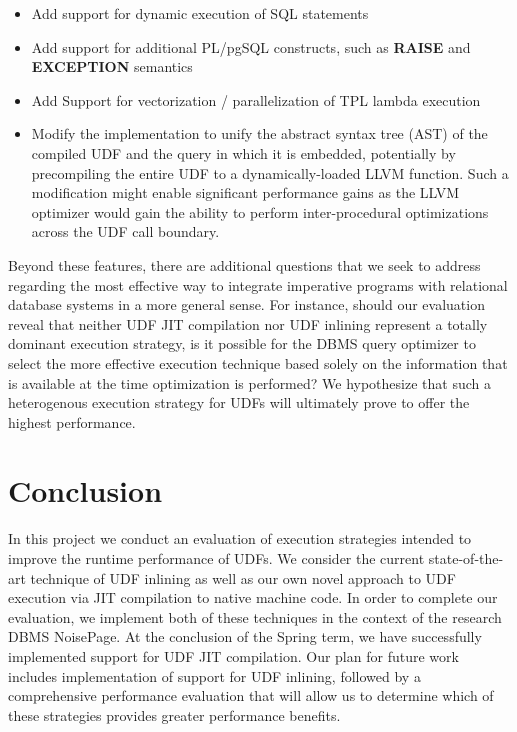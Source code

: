 \documentclass{vldb}
\newcommand{\dbCode}[1]{{\sffamily\small \textbf{#1}}\xspace}
\begin{document}
\begin{itemize}
    \item Add support for dynamic execution of SQL statements
    \item Add support for additional PL/pgSQL constructs, such as \dbCode{RAISE} and \dbCode{EXCEPTION} semantics
    \item Add Support for vectorization / parallelization of TPL lambda execution
    \item Modify the implementation to unify the abstract syntax tree (AST) of the compiled UDF and the query in which it is embedded, potentially by precompiling the entire UDF to a dynamically-loaded LLVM function. Such a modification might enable significant performance gains as the LLVM optimizer would gain the ability to perform inter-procedural optimizations across the UDF call boundary.
\end{itemize}

Beyond these features, there are additional questions that we seek to address regarding the most effective way to integrate imperative programs with relational database systems in a more general sense. For instance, should our evaluation reveal that neither UDF JIT compilation nor UDF inlining represent a totally dominant execution strategy, is it possible for the DBMS query optimizer to select the more effective execution technique based solely on the information that is available at the time optimization is performed? We hypothesize that such a heterogenous execution strategy for UDFs will ultimately prove to offer the highest performance.


\section{Conclusion}

In this project we conduct an evaluation of execution strategies intended to improve the runtime performance of UDFs. We consider the current state-of-the-art technique of UDF inlining as well as our own novel approach to UDF execution via JIT compilation to native machine code. In order to complete our evaluation, we implement both of these techniques in the context of the research DBMS NoisePage. At the conclusion of the Spring term, we have successfully implemented support for UDF JIT compilation. Our plan for future work includes implementation of support for UDF inlining, followed by a comprehensive performance evaluation that will allow us to determine which of these strategies provides greater performance benefits.
\end{document}

